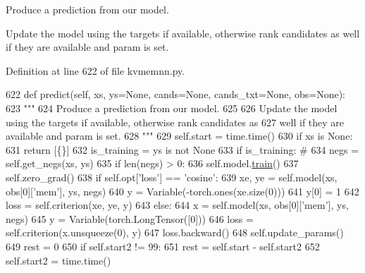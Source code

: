 \begin{DoxyVerb}Produce a prediction from our model.

Update the model using the targets if available, otherwise rank candidates as
well if they are available and param is set.
\end{DoxyVerb}
 

Definition at line 622 of file kvmemnn.\+py.


\begin{DoxyCode}
622     \textcolor{keyword}{def }predict(self, xs, ys=None, cands=None, cands\_txt=None, obs=None):
623         \textcolor{stringliteral}{"""}
624 \textcolor{stringliteral}{        Produce a prediction from our model.}
625 \textcolor{stringliteral}{}
626 \textcolor{stringliteral}{        Update the model using the targets if available, otherwise rank candidates as}
627 \textcolor{stringliteral}{        well if they are available and param is set.}
628 \textcolor{stringliteral}{        """}
629         self.start = time.time()
630         \textcolor{keywordflow}{if} xs \textcolor{keywordflow}{is} \textcolor{keywordtype}{None}:
631             \textcolor{keywordflow}{return} [\{\}]
632         is\_training = ys \textcolor{keywordflow}{is} \textcolor{keywordflow}{not} \textcolor{keywordtype}{None}
633         \textcolor{keywordflow}{if} is\_training:  \textcolor{comment}{#}
634             negs = self.get\_negs(xs, ys)
635             \textcolor{keywordflow}{if} len(negs) > 0:
636                 self.model.\hyperlink{namespaceprojects_1_1mastering__the__dungeon_1_1mturk_1_1tasks_1_1MTD_1_1run_a36a5f4f6f9df0611a6818610518d2cf0}{train}()
637                 self.zero\_grad()
638                 \textcolor{keywordflow}{if} self.opt[\textcolor{stringliteral}{'loss'}] == \textcolor{stringliteral}{'cosine'}:
639                     xe, ye = self.model(xs, obs[0][\textcolor{stringliteral}{'mem'}], ys, negs)
640                     y = Variable(-torch.ones(xe.size(0)))
641                     y[0] = 1
642                     loss = self.criterion(xe, ye, y)
643                 \textcolor{keywordflow}{else}:
644                     x = self.model(xs, obs[0][\textcolor{stringliteral}{'mem'}], ys, negs)
645                     y = Variable(torch.LongTensor([0]))
646                     loss = self.criterion(x.unsqueeze(0), y)
647                 loss.backward()
648                 self.update\_params()
649                 rest = 0
650                 \textcolor{keywordflow}{if} self.start2 != 99:
651                     rest = self.start - self.start2
652                 self.start2 = time.time()

\end{DoxyCode}
